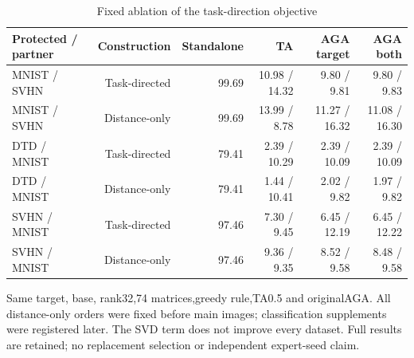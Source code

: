 \begin{table}[!htbp]
\centering
\small
\caption{Fixed ablation of the task-direction objective}
\label{tab:distance_ablation}
\begin{tabular}{lrrrrr}
\toprule
Protected / partner & Construction & Standalone & TA & AGA target & AGA both \\
\midrule
MNIST / SVHN & Task-directed & 99.69 & 10.98 / 14.32 & 9.80 / 9.81 & 9.80 / 9.83 \\
MNIST / SVHN & Distance-only & 99.69 & 13.99 / 8.78 & 11.27 / 16.32 & 11.08 / 16.30 \\
DTD / MNIST & Task-directed & 79.41 & 2.39 / 10.29 & 2.39 / 10.09 & 2.39 / 10.09 \\
DTD / MNIST & Distance-only & 79.41 & 1.44 / 10.41 & 2.02 / 9.82 & 1.97 / 9.82 \\
SVHN / MNIST & Task-directed & 97.46 & 7.30 / 9.45 & 6.45 / 12.19 & 6.45 / 12.22 \\
SVHN / MNIST & Distance-only & 97.46 & 9.36 / 9.35 & 8.52 / 9.58 & 8.48 / 9.58 \\
\bottomrule
\end{tabular}
\par\vspace{3pt}\begin{minipage}{0.98\linewidth}\footnotesize Same target, base, rank32,74 matrices,greedy rule,TA0.5 and originalAGA. All distance-only orders were fixed before main images; classification supplements were registered later. The SVD term does not improve every dataset. Full results are retained; no replacement selection or independent expert-seed claim.\end{minipage}
\end{table}

